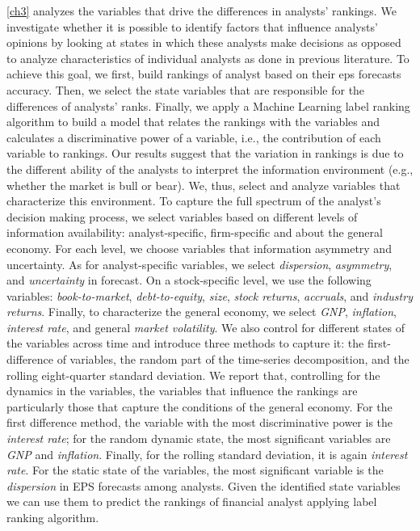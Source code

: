 \ref{ch3} analyzes the variables that drive the differences in analysts’ rankings. We investigate whether it is possible to identify factors that influence analysts’ opinions by looking at states in which these analysts make decisions as opposed to analyze characteristics of individual analysts as done in previous literature. To achieve this goal, we first, build rankings of analyst based on their \gls{eps} forecasts accuracy. Then, we select the state variables that are responsible for the  differences of analysts’ ranks. Finally, we apply a Machine Learning label ranking algorithm to build a model that relates the rankings with the variables and calculates a discriminative power of a variable, i.e., the contribution of each variable to rankings. Our results suggest that the variation in rankings is due to the different ability of the analysts to interpret the information environment (e.g., whether the market is bull or bear). We, thus, select and analyze variables that characterize this environment. To capture the full spectrum of the analyst’s decision making process, we select variables based on different levels of information availability: analyst-specific, firm-specific and about the  general economy. For each level, we choose variables  that  information asymmetry and uncertainty. As for analyst-specific variables, we select \emph{dispersion}, \emph{asymmetry}, and \emph{uncertainty} in forecast. On a stock-specific level, we use the following variables: \emph{book-to-market}, \emph{debt-to-equity}, \emph{size}, \emph{stock returns}, \emph{accruals}, and \emph{industry returns}. Finally, to characterize the general economy, we select \emph{GNP}, \emph{inflation}, \emph{interest rate}, and general \emph{market volatility}. We also control for different states of the variables across time and introduce three methods to capture it: the first-difference of variables, the random part of the time-series decomposition, and the rolling eight-quarter standard deviation. We report that, controlling for the dynamics in the variables, the variables that influence the rankings are particularly those that capture the conditions of  the general economy. For the first difference method, the variable with the most discriminative power is the \emph{interest rate}; for the random dynamic state, the most significant variables are \emph{GNP} and \emph{inflation}. Finally, for the rolling standard deviation, it is again \emph{interest rate}. For the static state of the variables, the most significant variable is the \emph{dispersion} in EPS  forecasts  among analysts. Given the identified state variables we can use them to predict the rankings of financial analyst applying label ranking algorithm. 

